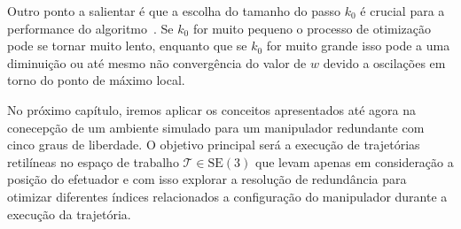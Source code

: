 Outro ponto a salientar é que a escolha do tamanho do passo \(k_0\) é crucial
para a performance do algoritmo~\cite[p. 256]{siciliano_springer_2008}. Se \(k_0\) 
for muito pequeno o processo de otimização pode se tornar muito lento, enquanto 
que se \(k_0\) for muito grande isso pode a uma diminuição ou até
 mesmo não convergência do valor de \(w\) devido a oscilações em torno do ponto 
 de máximo local.

No próximo capítulo, iremos aplicar os conceitos apresentados até agora na
conecepção de um ambiente simulado para um manipulador redundante com cinco
graus de liberdade. O objetivo principal será a execução de trajetórias
retilíneas no espaço de trabalho \(\mathcal{T} \in \text{SE}(3)\) que levam
apenas em consideração a posição do efetuador e com isso explorar a resolução
de redundância para otimizar diferentes índices relacionados a configuração do
manipulador durante a execução da trajetória.
